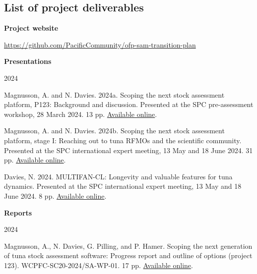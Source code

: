 \documentclass{SCreport}
\begin{document}
\newpage

\subsection{List of project deliverables}
\label{sec:deliverables}

\vspace{1.5ex}

\textbf{Project website}

\href{https://github.com/PacificCommunity/ofp-sam-transition-plan}
{https://github.com/PacificCommunity/ofp-sam-transition-plan}

\vspace{2ex}

\textbf{Presentations}

2024

\begin{description}\setlength\itemsep{0ex}
  \item Magnusson, A. and N. Davies. 2024a. Scoping the next stock assessment
  platform, P123: Background and discussion. Presented at the SPC pre-assessment
  workshop, 28 March 2024. 13 pp.
  \href{https://github.com/PacificCommunity/ofp-sam-transition-plan/blob/main/presentations/2024_03_28_paw_scoping/2024_03_28_paw_scoping.pdf}
  {Available online}.
  \item Magnusson, A. and N. Davies. 2024b. Scoping the next stock assessment
  platform, stage I: Reaching out to tuna RFMOs and the scientific community.
  Presented at the SPC international expert meeting, 13 May and 18 June 2024. 31
  pp.
  \href{https://github.com/PacificCommunity/ofp-sam-transition-plan/blob/main/presentations/2024_05_13_experts_scoping/2024_05_13_experts_scoping.pdf}
  {Available online}.
  \item Davies, N. 2024. MULTIFAN-CL: Longevity and valuable features for tuna
  dynamics. Presented at the SPC international expert meeting, 13 May and 18
  June 2024. 8 pp.
  \href{https://github.com/PacificCommunity/ofp-sam-transition-plan/blob/main/presentations/2024_05_13_mfcl_future/MULTIFAN-CL_future.pdf}
  {Available online}.
\end{description}

\vspace{2ex}

\textbf{Reports}

2024

\begin{description}\setlength\itemsep{0ex}
  \item Magnusson, A., N. Davies, G. Pilling, and P. Hamer. Scoping the next
  generation of tuna stock assessment software: Progress report and outline of
  options (project 123). WCPFC-SC20-2024/SA-WP-01. 17 pp.
  \href{https://github.com/PacificCommunity/ofp-sam-transition-plan/blob/main/documents/2024_08_14_wcpfc_manila/p123_progress_report_sc20.pdf}
  {Available online}.
\end{description}
\end{document}
